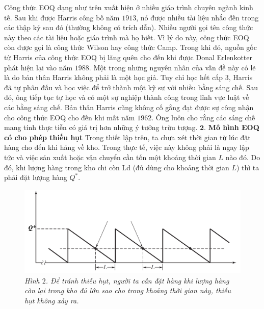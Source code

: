 \begin{multicols}{2}
\begin{figure}[H]
		\vspace*{-10pt}
	\end{figure}
	Công thức EOQ dạng như trên xuất hiện ở nhiều giáo trình chuyên ngành kinh tế. Sau khi được Harris công bố năm $1913$, nó được nhiều tài liệu nhắc đến trong các thập kỷ sau đó (thường không có trích dẫn). Nhiều người gọi tên công thức này theo các tài liệu hoặc giáo trình mà họ biết. Vì lý do này, công thức EOQ còn được gọi là công thức Wilson hay công thức Camp. Trong khi đó, nguồn gốc từ Harris của công thức EOQ bị lãng quên cho đến khi được Donal Erlenkotter phát hiện lại vào năm $1988$. Một trong những nguyên nhân của vấn đề này có lẽ là do bản thân Harris không phải là một học giả. Tuy chỉ học hết cấp $3$, Harris đã tự phân đấu và học việc để trở thành một kỹ sư với nhiều bằng sáng chế. Sau đó, ông tiếp tục tự học và có một sự nghiệp thành công trong lĩnh vực luật về các bằng sáng chế. Bản thân Harris cũng không cố gắng đạt được sự công nhận cho công thức EOQ cho đến khi mất năm $1962$. Ông luôn cho rằng các sáng chế mang tính thực tiễn có giá trị hơn những ý tưởng trừu tượng.
	\vskip 0.1cm
	$\pmb{2.}$ \textbf{\color{toanhocdoisong}Mô hình EOQ có cho phép thiếu hụt}
	\vskip 0.1cm
	Trong thiết lập trên, ta chưa xét thời gian từ lúc đặt hàng cho đến khi hảng về kho. Trong thực tế, việc này không phải là ngay lập tức và việc sản xuất hoặc vận chuyển cần tốn một khoảng thời gian $L$ nào đó. Do đó, khi lượng hàng trong kho chi còn Ld (đủ dùng cho khoảng thời gian $L$) thì ta phải đặt lượng hàng $Q^*$.
	\begin{figure}[H]
		\vspace*{-5pt}
		\centering
		\captionsetup{labelformat= empty, justification=centering}
		\includegraphics[width= 1\linewidth]{3}
		\caption{\small\textit{\color{toanhocdoisong}Hình $2$. Để tránh thiếu hụt, người ta cần đặt hàng khi lượng hàng còn lại trong kho đủ lớn sao cho trong khoảng thời gian này, thiếu hụt không xảy ra.}}
		\vspace*{-10pt}
	\end{figure}

\end{multicols}
